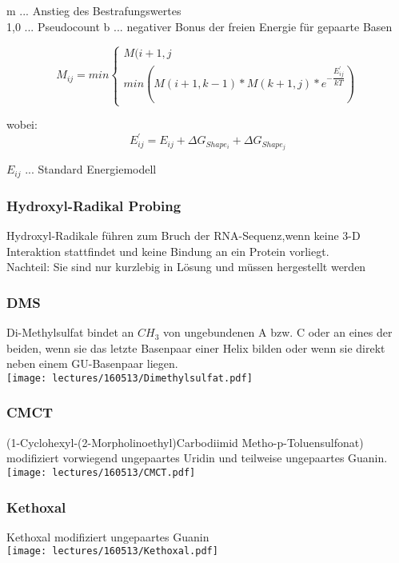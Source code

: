 m ... Anstieg des Bestrafungswertes \\
1,0 ... Pseudocount
b ... negativer Bonus der freien Energie für gepaarte Basen

\begin{equation}
M_{ij} = min
\begin{cases} 
M(i+1,j \\
min (M(i+1,k-1)*M(k+1,j)*e^{-\dfrac{E^{'}_{ij}}{kT}})
\end{cases}
\end{equation}

wobei:
\begin{equation}
E^{'}_{ij} = E_{ij} + \Delta G_{Shape_i} + \Delta G_{Shape_j}
\end{equation}

$E_{ij}$ ... Standard Energiemodell

\subsubsection{Hydroxyl-Radikal Probing}
Hydroxyl-Radikale führen zum Bruch der RNA-Sequenz,wenn keine 3-D Interaktion stattfindet und keine Bindung an ein Protein vorliegt.\\
Nachteil: Sie sind nur kurzlebig in Lösung und müssen hergestellt werden

\subsubsection{DMS}
Di-Methylsulfat bindet an $CH_3$ von ungebundenen A bzw. C oder an eines der beiden, wenn sie das letzte Basenpaar einer Helix bilden oder wenn sie direkt neben einem GU-Basenpaar liegen. \\
\texttt{[image: lectures/160513/Dimethylsulfat.pdf]} \\

\subsubsection{CMCT}
(1-Cyclohexyl-(2-Morpholinoethyl)Carbodiimid Metho-p-Toluensulfonat) modifiziert vorwiegend ungepaartes Uridin und teilweise ungepaartes Guanin. \\
\texttt{[image: lectures/160513/CMCT.pdf]} \\

\subsubsection{Kethoxal}
Kethoxal modifiziert ungepaartes Guanin \\
\texttt{[image: lectures/160513/Kethoxal.pdf]}

